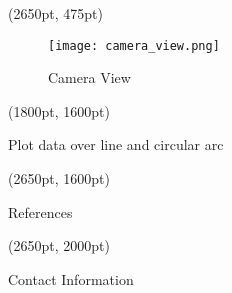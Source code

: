 \documentclass[final]{beamer}
\begin{document}
\begin{textblock*}{800pt}(2650pt, 475pt)
\begin{figure}
\texttt{[image: camera\_view.png]}
\caption{Camera View}
\end{figure}
\end{textblock*}

\begin{textblock*}{800pt}(1800pt, 1600pt)
\begin{block}{Plot data over line and circular arc}
\end{block}
\end{textblock*}

\begin{textblock*}{800pt}(2650pt, 1600pt)
\begin{block}{References}
\end{block}
\end{textblock*}


\begin{textblock*}{800pt}(2650pt, 2000pt)
\begin{alertblock}{Contact Information}
\end{alertblock}
\end{textblock*}
\end{document}
